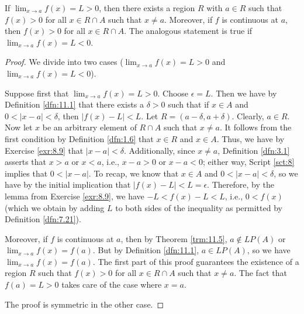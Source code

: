 \documentclass[../main.tex]{subfiles}
\begin{document}
\begin{lemma}\label{lem:11.8}
    If $\lim_{x\to a}f(x)=L>0$, then there exists a region $R$ with $a\in R$ such that $f(x)>0$ for all $x\in R\cap A$ such that $x\neq a$. Moreover, if $f$ is continuous at $a$, then $f(x)>0$ for all $x\in R\cap A$. The analogous statement is true if $\lim_{x\to a}f(x)=L<0$.
    \begin{proof}
        We divide into two cases ($\lim_{x\to a}f(x)=L>0$ and $\lim_{x\to a}f(x)=L<0$).\par\smallskip
        Suppose first that $\lim_{x\to a}f(x)=L>0$. Choose $\epsilon=L$. Then we have by Definition \ref{dfn:11.1} that there exists a $\delta>0$ such that if $x\in A$ and $0<|x-a|<\delta$, then $|f(x)-L|<L$. Let $R=(a-\delta,a+\delta)$. Clearly, $a\in R$. Now let $x$ be an arbitrary element of $R\cap A$ such that $x\neq a$. It follows from the first condition by Definition \ref{dfn:1.6} that $x\in R$ and $x\in A$. Thus, we have by Exercise \ref{exr:8.9} that $|x-a|<\delta$. Additionally, since $x\neq a$, Definition \ref{dfn:3.1} asserts that $x>a$ or $x<a$, i.e., $x-a>0$ or $x-a<0$; either way, Script \ref{sct:8} implies that $0<|x-a|$. To recap, we know that $x\in A$ and $0<|x-a|<\delta$, so we have by the initial implication that $|f(x)-L|<L=\epsilon$. Therefore, by the lemma from Exercise \ref{exr:8.9}, we have $-L<f(x)-L<L$, i.e., $0<f(x)$ (which we obtain by adding $L$ to both sides of the inequality as permitted by Definition \ref{dfn:7.21}).\par
        Moreover, if $f$ is continuous at $a$, then by Theorem \ref{trm:11.5}, $a\notin LP(A)$ or $\lim_{x\to a}f(x)=f(a)$. But by Definition \ref{dfn:11.1}, $a\in LP(A)$, so we have $\lim_{x\to a}f(x)=f(a)$. The first part of this proof guarantees the existence of a region $R$ such that $f(x)>0$ for all $x\in R\cap A$ such that $x\neq a$. The fact that $f(a)=L>0$ takes care of the case where $x=a$.\par\smallskip
        The proof is symmetric in the other case.
    \end{proof}
\end{lemma}
\end{document}
